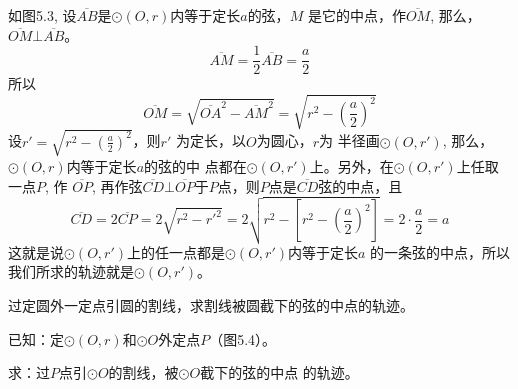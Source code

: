 \begin{solution}
    如图5.3, 设$\overline{AB}$是$\odot (O,r)$内等于定长$a$的弦，$M$
是它的中点，作$\overline{OM}$, 那么，$\overline{OM}\bot \overline{AB}$。
\[\overline{AM}=\frac{1}{2}\overline{AB}=\frac{a}{2}\]
所以
\[\overline{OM}=\sqrt{\overline{OA}^2-\overline{AM}^2}=\sqrt{r^2-\left(\frac{a}{2}\right)^2}\]
设$r'=\sqrt{r^2-\left(\frac{a}{2}\right)^2}$，则$r'$
为定长，以$O$为圆心，$r$为
半径画$\odot (O,r')$, 那么，$\odot (O,r)$内等于定长$a$的弦的中
点都在$\odot (O,r')$上。另外，在$\odot (O,r')$上任取一点$P$, 作
$\overline{OP}$, 再作弦$\overline{CD}\bot\overline{OP}$于$P$点，则$P$点是$\overline{CD}$弦的中点，且
\[\overline{CD}=2\overline{CP}=2\sqrt{r^2-{r'}^2}=2\sqrt{r^2-\left[r^2-\left(\frac{a}{2}\right)^2\right]}=2\cdot\frac{a}{2}=a\]
这就是说$\odot (O,r')$上的任一点都是$\odot (O,r')$内等于定长$a$
的一条弦的中点，所以我们所求的轨迹就是$\odot (O,r')$。
\end{solution}

\begin{example}
    过定圆外一定点引圆的割线，求割线被圆截下的弦的中点的轨迹。

    已知：定$\odot (O,r)$和$\odot O$外定点$P$（图5.4）。
    
    求：过$P$点引$\odot O$的割线，被$\odot O$截下的弦的中点
    的轨迹。
\end{example}


\begin{figure}[htp]
    \centering
{}
    \caption{}
\end{figure}

